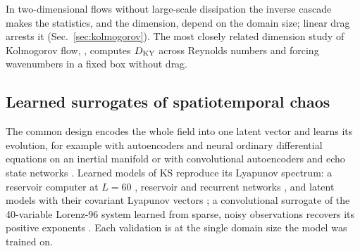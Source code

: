 In two-dimensional flows without large-scale dissipation the inverse
cascade makes the statistics, and the dimension, depend on the domain
size; linear drag arrests it (Sec.~\ref{sec:kolmogorov}). The most closely
related dimension study of Kolmogorov flow, \citet{kolmogorovregimes2026},
computes $D_{\mathrm{KY}}$ across Reynolds numbers and forcing wavenumbers in a fixed
box without drag.

\subsection{Learned surrogates of spatiotemporal chaos}
\label{sec:bg_surrogates}

 The common
design encodes the whole field into one latent vector and learns its
evolution, for example with autoencoders and neural ordinary differential
equations on an inertial manifold \citep{linotgraham2020,linotgraham2022}
or with convolutional autoencoders and echo state networks
\citep{racca2023}. Learned models of KS reproduce its Lyapunov spectrum: a
reservoir computer at $L=60$ \citep{pathak2017}, reservoir and recurrent
networks \citep{vlachas2020}, and latent models with their covariant
Lyapunov vectors \citep{ozalp2023,ozalpmagri2025}; a convolutional
surrogate of the 40-variable Lorenz-96 system learned from sparse, noisy
observations recovers its positive exponents \citep{brajard2020,bocquet2020}.
Each validation is at the single domain size the model was trained on.

